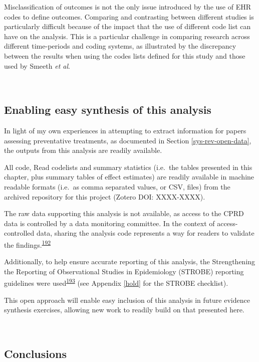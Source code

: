 \documentclass[a4paper, twoside]{templates/ociamthesis}
\begin{document}
Misclassification of outcomes is not the only issue introduced by the use of EHR codes to define outcomes. Comparing and contrasting between different studies is particularly difficult because of the impact that the use of different code list can have on the analysis. This is a particular challenge in comparing research across different time-periods and coding systems, as illustrated by the discrepancy between the results when using the codes lists defined for this study and those used by Smeeth \emph{et al}.

~

\hypertarget{cprd-data-avail}{%
\subsection{Enabling easy synthesis of this analysis}\label{cprd-data-avail}}

In light of my own experiences in attempting to extract information for papers assessing preventative treatments, as documented in Section \ref{sys-rev-open-data}, the outputs from this analysis are readily available.

All code, Read codelists and summary statistics (i.e.~the tables presented in this chapter, plus summary tables of effect estimates) are readily available in machine readable formats (i.e.~as comma separated values, or CSV, files) from the archived repository for this project (Zotero DOI: XXXX-XXXX).

The raw data supporting this analysis is not available, as access to the CPRD data is controlled by a data monitoring committee. In the context of access-controlled data, sharing the analysis code represents a way for readers to validate the findings.\textsuperscript{\protect\hyperlink{ref-goldacre2019c}{192}}

Additionally, to help ensure accurate reporting of this analysis, the Strengthening the Reporting of Observational Studies in Epidemiology (STROBE) reporting guidelines were used\textsuperscript{\protect\hyperlink{ref-vandenbroucke2007}{193}} (see Appendix \ref{hold} for the STROBE checklist).

This open approach will enable easy inclusion of this analysis in future evidence synthesis exercises, allowing new work to readily build on that presented here.

~

\hypertarget{conclusions-1}{%
\subsection{Conclusions}\label{conclusions-1}}
\end{document}
